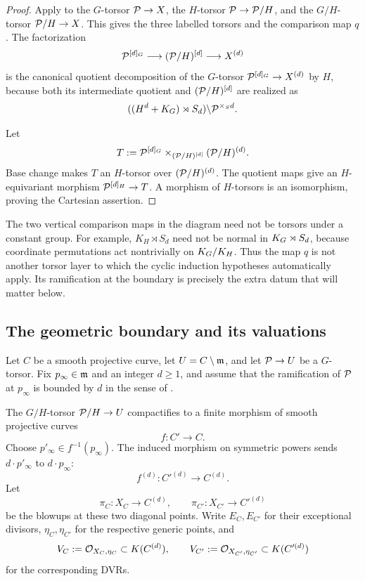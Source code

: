 \begin{proof}
Apply  to the $G$-torsor $\mathcal{P}\to X$, the
$H$-torsor $\mathcal{P}\to\mathcal{P}/H$, and the $G/H$-torsor $\mathcal{P}/H\to X$. This gives the
three labelled torsors and the comparison map $q$. The factorization
\[
\mathcal{P}^{[d]_G}\longrightarrow(\mathcal{P}/H)^{[d]}\longrightarrow X^{(d)}
\]
is the canonical quotient decomposition of the $G$-torsor
$\mathcal{P}^{[d]_G}\to X^{(d)}$ by $H$, because both its intermediate quotient and
$(\mathcal{P}/H)^{[d]}$ are realized as
\[
((H^d+K_{G})\rtimes S_d)\backslash\mathcal{P}^{\times_S d}.
\]

Let
\[
T:=\mathcal{P}^{[d]_G}\times_{(\mathcal{P}/H)^{[d]}}(\mathcal{P}/H)^{(d)}.
\]
Base change makes $T$ an $H$-torsor over $(\mathcal{P}/H)^{(d)}$. The quotient maps
give an $H$-equivariant morphism $\mathcal{P}^{[d]_H}\to T$. A morphism of
$H$-torsors is an isomorphism, proving the Cartesian assertion.
\end{proof}

\begin{rem*}
The two vertical comparison maps in the diagram need not be torsors under a
constant group. For example, $K_H\rtimes S_d$ need not be normal in
$K_{G}\rtimes S_d$, because coordinate permutations act nontrivially on
$K_{G}/K_H$. Thus the map $q$ is not another torsor layer to which the cyclic
induction hypotheses automatically apply. Its ramification at the boundary
is precisely the extra datum that will matter below.
\end{rem*}


\subsection{The geometric boundary and its valuations}

Let $C$ be a smooth projective curve, let $U=C\setminus\mathfrak{m}$, and let
$\mathcal{P}\to U$ be a $G$-torsor. Fix $p_\infty\in\mathfrak{m}$ and an integer $d\geq1$,
and assume that the ramification of $\mathcal{P}$ at $p_\infty$ is bounded by $d$ in
the sense of .

The $G/H$-torsor $\mathcal{P}/H\to U$ compactifies to a finite morphism of smooth
projective curves
\[
f:C'\longrightarrow C.
\]
Choose $p'_\infty\in f^{-1}(p_\infty)$. The induced morphism on symmetric
powers sends $d\cdot p'_\infty$ to $d\cdot p_\infty$:
\[
f^{(d)}:C'^{(d)}\longrightarrow C^{(d)}.
\]
Let
\[
\pi_C:X_C\longrightarrow C^{(d)},\qquad
\pi_{C'}:X_{C'}\longrightarrow C'^{(d)}
\]
be the blowups at these two diagonal points. Write $E_C,E_{C'}$ for their
exceptional divisors, $\eta_C,\eta_{C'}$ for the respective generic points,
and
\[
V_C:=\mathcal{O}_{X_C,\eta_C}\subset K(C^{(d)}),\qquad
V_{C'}:=\mathcal{O}_{X_{C'},\eta_{C'}}\subset K(C'^{(d)})
\]
for the corresponding DVRs.


